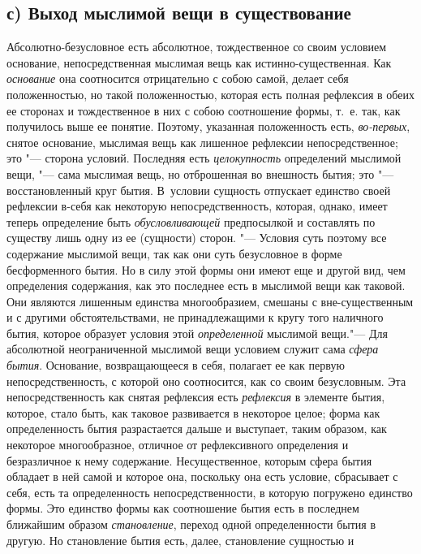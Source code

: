 \subsection[с) Выход мыслимой вещи в существование]
{с) Выход мыслимой вещи в существование}

Абсолютно-безусловное есть абсолютное,
тождественное со своим условием основание, непосредственная мыслимая вещь
как истинно-существенная. Как {\em основание} она
соотносится отрицательно с собою самой, делает себя положенностью, но такой
положенностью, которая есть полная рефлексия в обеих ее сторонах и
тождественное в них с собою соотношение формы, т.~е. так, как получилось
выше ее понятие. Поэтому, указанная положенность есть,
{\em во-первых}, снятое основание, мыслимая вещь как
лишенное рефлексии непосредственное; это "--- сторона условий. Последняя есть
{\em целокупность} определений мыслимой вещи, "--- сама
мыслимая вещь, но отброшенная во внешность бытия; это "--- восстановленный
круг бытия. В~условии сущность отпускает единство своей рефлексии в-себя
как некоторую непосредственность, которая, однако, имеет теперь определение
быть {\em обусловливающей} предпосылкой и составлять по
существу лишь одну из ее (сущности) сторон. "--- Условия суть поэтому все
содержание мыслимой вещи, так как они суть безусловное в форме
бесформенного бытия. Но в силу этой формы они имеют еще и другой вид, чем
определения содержания, как это последнее есть в мыслимой вещи как таковой.
Они являются лишенным единства многообразием, смешаны с вне-существенным и
с другими обстоятельствами, не принадлежащими к кругу того наличного бытия,
которое образует условия этой {\em определенной}
мыслимой вещи."--- Для абсолютной неограниченной мыслимой вещи условием служит
сама {\em сфера бытия}. Основание, возвращающееся в
себя, полагает ее как первую непосредственность, с которой оно соотносится,
как со своим безусловным. Эта непосредственность как снятая рефлексия есть
{\em рефлексия} в элементе бытия, которое, стало быть,
как таковое развивается в некоторое целое; форма как определенность бытия
разрастается дальше и выступает, таким образом, как некоторое
многообразное, отличное от рефлексивного определения и безразличное к нему
содержание. Несущественное, которым сфера бытия обладает в ней самой и
которое она, поскольку она есть условие, сбрасывает с себя, есть та
определенность непосредственности, в которую погружено единство формы. Это
единство формы как соотношение бытия есть в последнем ближайшим образом
{\em становление}, переход одной определенности бытия в
другую. Но становление бытия есть, далее, становление сущностью и
